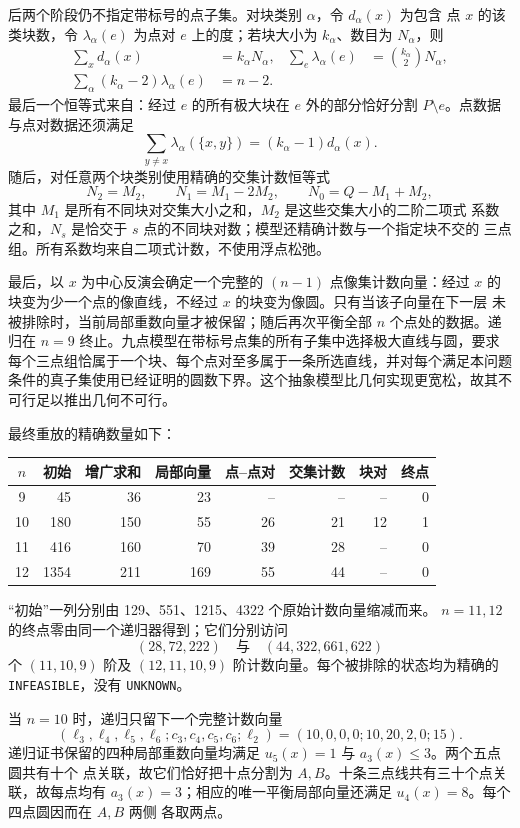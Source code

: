后两个阶段仍不指定带标号的点子集。对块类别 $\alpha$，令 $d_\alpha(x)$ 为包含
点 $x$ 的该类块数，令
$\lambda_\alpha(e)$ 为点对 $e$ 上的度；若块大小为 $k_\alpha$、数目为
$N_\alpha$，则
\begin{align}
 \sum_xd_\alpha(x)&=k_\alpha N_\alpha,&
 \sum_e\lambda_\alpha(e)&=\binom{k_\alpha}{2}N_\alpha,
 \label{eq:small-category-totals}\\
 \sum_\alpha(k_\alpha-2)\lambda_\alpha(e)&=n-2.
 \label{eq:small-pair-profile2}
\end{align}
最后一个恒等式来自：经过 $e$ 的所有极大块在 $e$ 外的部分恰好分割
$P\setminus e$。点数据与点对数据还须满足
\[
\sum_{y\ne x}\lambda_\alpha(\{x,y\})
=(k_\alpha-1)d_\alpha(x).
\]
随后，对任意两个块类别使用精确的交集计数恒等式
\[
 N_2=M_2,\qquad N_1=M_1-2M_2,\qquad N_0=Q-M_1+M_2,
\]
其中 $M_1$ 是所有不同块对交集大小之和，$M_2$ 是这些交集大小的二阶二项式
系数之和，$N_s$ 是恰交于 $s$ 点的不同块对数；模型还精确计数与一个指定块不交的
三点组。所有系数均来自二项式计数，不使用浮点松弛。

最后，以 $x$ 为中心反演会确定一个完整的 $(n-1)$ 点像集计数向量：经过
$x$ 的块变为少一个点的像直线，不经过 $x$ 的块变为像圆。只有当该子向量在下一层
未被排除时，当前局部重数向量才被保留；随后再次平衡全部 $n$ 个点处的数据。递归在
$n=9$ 终止。九点模型在带标号点集的所有子集中选择极大直线与圆，要求每个三点组恰属于一个块、每个点对至多属于一条所选直线，并对每个满足本问题条件的真子集使用已经证明的圆数下界。这个抽象模型比几何实现更宽松，故其不可行足以推出几何不可行。

最终重放的精确数量如下：
\begin{center}
\small
\begin{tabular}{c|rrrrrrr}
\toprule
$n$ & 初始 & 增广求和 & 局部向量 & 点--点对 & 交集计数 & 块对 & 终点\\
\midrule
9  &45   &36  &23  &-- &-- &-- &0\\
10 &180  &150 &55  &26 &21 &12 &1\\
11 &416  &160 &70  &39 &28 &-- &0\\
12 &1354 &211 &169 &55 &44 &-- &0\\
\bottomrule
\end{tabular}
\end{center}
“初始”一列分别由 129、551、1215、4322 个原始计数向量缩减而来。
$n=11,12$ 的终点零由同一个递归器得到；它们分别访问
\[
 (28,72,222)\quad\text{与}\quad(44,322,661,622)
\]
个 $(11,10,9)$ 阶及 $(12,11,10,9)$ 阶计数向量。每个被排除的状态均为精确的
\texttt{INFEASIBLE}，没有 \texttt{UNKNOWN}。

当 $n=10$ 时，递归只留下一个完整计数向量
\[
 (\ell_3,\ell_4,\ell_5,\ell_6;
   c_3,c_4,c_5,c_6;\ell_2)
 =(10,0,0,0;10,20,2,0;15).
\]
递归证书保留的四种局部重数向量均满足 $u_5(x)=1$ 与 $a_3(x)\le3$。两个五点圆共有十个
点关联，故它们恰好把十点分割为 $A,B$。十条三点线共有三十个点关联，故每点均有
$a_3(x)=3$；相应的唯一平衡局部向量还满足 $u_4(x)=8$。每个四点圆因而在 $A,B$ 两侧
各取两点。

